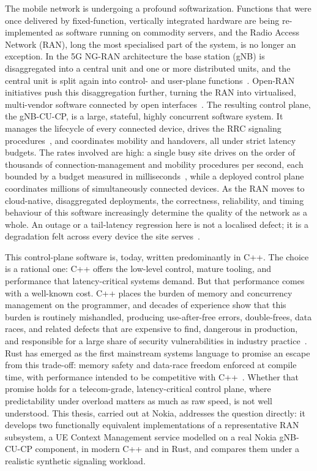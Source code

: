 \documentclass[english,twoside,openright,a4paper,censored,csm,software-track-2020]{HYthesisML}
\begin{document}
The mobile network is undergoing a profound softwarization. Functions that were once
delivered by fixed-function, vertically integrated hardware are being re-implemented as
software running on commodity servers, and the Radio Access Network (RAN), long the most
specialised part of the system, is no longer an exception. In the 5G NG-RAN architecture the
base station (gNB) is disaggregated into a central unit and one or more distributed units,
and the central unit is split again into control- and user-plane
functions~\cite{3gpp38401,3gpp38300}. Open-RAN initiatives push this disaggregation further,
turning the RAN into virtualised, multi-vendor software connected by open
interfaces~\cite{polese2023oran}. The resulting control plane, the gNB-CU-CP, is a large,
stateful, highly concurrent software system. It manages the lifecycle of every connected
device, drives the RRC signaling procedures~\cite{3gpp38331}, and coordinates mobility and
handovers, all under strict latency budgets. The rates involved are high: a single busy site
drives on the order of thousands of connection-management and mobility procedures per second,
each bounded by a budget measured in milliseconds~\cite{3gpp22261}, while a deployed control
plane coordinates millions of simultaneously connected devices. As the RAN moves to cloud-native,
disaggregated deployments, the correctness, reliability, and timing behaviour of this
software increasingly determine the quality of the network as a whole. An outage or a
tail-latency regression here is not a localised defect; it is a degradation felt across every
device the site serves~\cite{dean2013tail,barroso2017microseconds}.

This control-plane software is, today, written predominantly in C++. The choice is a
rational one: C++ offers the low-level control, mature tooling, and performance that
latency-critical systems demand. But that performance comes with a well-known cost. C++
places the burden of memory and concurrency management on the programmer, and decades of
experience show that this burden is routinely mishandled, producing use-after-free errors,
double-frees, data races, and related defects that are expensive to find, dangerous in
production, and responsible for a large share of security vulnerabilities in industry
practice~\cite{msrc2019memory,google2022android}. Rust has emerged as the first mainstream
systems language to promise an escape from this trade-off: memory safety and data-race
freedom enforced at compile time, with performance intended to be competitive with
C++~\cite{klabnik2023rust,jung2018rustbelt}. Whether that promise holds for a
telecom-grade, latency-critical control plane, where predictability under overload matters
as much as raw speed, is not well understood. This thesis, carried out at Nokia, addresses
the question directly: it develops two functionally equivalent implementations of a
representative RAN subsystem, a UE Context Management service modelled on a real Nokia
gNB-CU-CP component, in modern C++ and in Rust, and compares them under a realistic
synthetic signaling workload.
\end{document}
